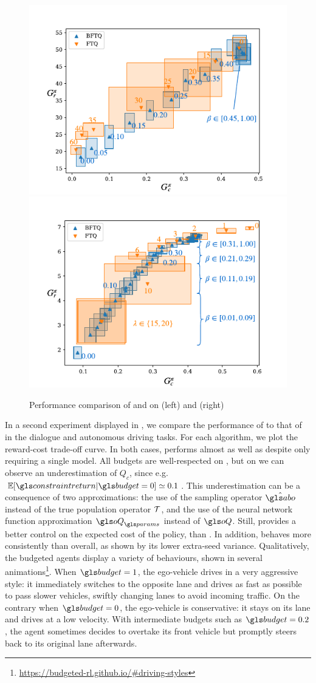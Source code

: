 \begin{figure}[tp]
	\begin{center}
		\includegraphics[width=0.49\linewidth]{img/slot-filling}
		\includegraphics[width=0.49\linewidth]{img/highway}
		\caption{Performance comparison of \FTQl and \BFTQ on  (left) and (right) }
		\label{sec:brl-results}
	\end{center}
\end{figure}

In a second experiment displayed in , we compare the performance of \FTQl to that of \BFTQ in the dialogue and autonomous driving tasks. 
For each algorithm, we plot the reward-cost trade-off curve. In both cases, \BFTQ performs almost as well as \FTQl despite only requiring a single model. All budgets are well-respected on , but on  we can observe an underestimation of $Q_c$, since e.g. $\expectedvalue[\constraintreturn|\budget=0] \simeq 0.1 $. This underestimation can be a consequence of two approximations: the use of the sampling operator $\hat{\abo}$ instead of the true population operator $\mathcal{T}$, and the use of the neural network function approximation $\oQ_\params$ instead of $\oQ$.
Still, \BFTQ provides a better control on the expected cost of the policy, than \FTQl. In addition, \BFTQ behaves more consistently than \FTQl overall, as shown by its lower extra-seed variance.
Qualitatively, the budgeted agents display a variety of behaviours, shown in several animations\footnote{\href{https://budgeted-rl.github.io/\#driving-styles}{https://budgeted-rl.github.io/\#driving-styles}}. When $\budget = 1$, the ego-vehicle drives in a very aggressive style: it immediately switches to the opposite lane and drives as fast as possible to pass slower vehicles, swiftly changing lanes to avoid incoming traffic. On the contrary when $\budget = 0$, the ego-vehicle is conservative: it stays on its lane and drives at a low velocity. With intermediate budgets such as $\budget = 0.2$, the agent sometimes decides to overtake its front vehicle but promptly steers back to its original lane afterwards.

